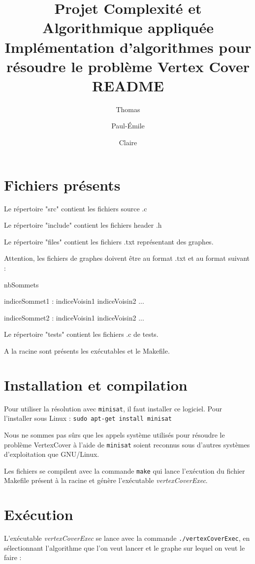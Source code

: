 \documentclass[a4paper,10pt]{article}
\title{Projet Complexité et Algorithmique appliquée\\ Implémentation d'algorithmes pour résoudre le problème Vertex Cover \\
README}
\author{Thomas \bsc{Bellitto}\and Paul-Émile \bsc{Boutoille} \and Claire \bsc{Pennarun}}
\date{}
\begin{document}
\maketitle
\section{Fichiers présents}

	Le répertoire "src" contient les fichiers source .c
	
	Le répertoire "include" contient les fichiers header .h
	
	Le répertoire "files" contient les fichiers .txt représentant des graphes.
	
	Attention, les fichiers de graphes doivent être au format .txt et au format suivant :

	nbSommets
	
	indiceSommet1 : indiceVoisin1 indiceVoisin2 ...
	
	indiceSommet2 : indiceVoisin1 indiceVoisin2 ...
	
	Le répertoire "tests" contient les fichiers .c de tests.
	
	A la racine sont présents les exécutables et le Makefile.


\section{Installation et compilation}

	Pour utiliser la résolution avec \texttt{minisat}, il faut installer ce logiciel.
	Pour l'installer sous Linux :
	\texttt{sudo apt-get install minisat}
	
	Nous ne sommes pas sûrs que les appels système utilisés pour résoudre le problème VertexCover à l'aide de \texttt{minisat} soient reconnus sous d'autres systèmes d'exploitation que GNU/Linux.

	Les fichiers se compilent avec la commande \texttt{make} qui lance l'exécution du fichier Makefile présent à la racine et génère l'exécutable \textit{vertexCoverExec}.


\section{Exécution}

	L'exécutable \textit{vertexCoverExec} se lance avec la commande \texttt{./vertexCoverExec}, en sélectionnant l'algorithme que l'on veut lancer et le graphe sur lequel on veut le faire :
	
\end{document}
